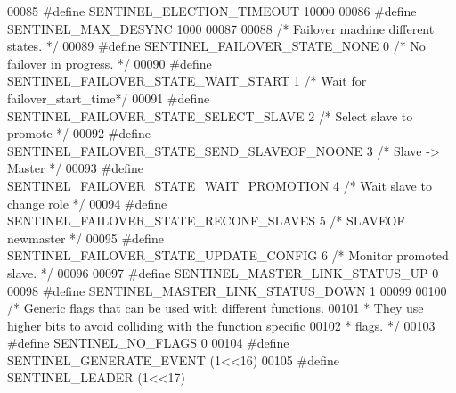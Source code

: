\begin{DoxyCode}
00085 \textcolor{preprocessor}{#}\textcolor{preprocessor}{define} \textcolor{preprocessor}{SENTINEL\_ELECTION\_TIMEOUT} 10000
00086 \textcolor{preprocessor}{#}\textcolor{preprocessor}{define} \textcolor{preprocessor}{SENTINEL\_MAX\_DESYNC} 1000
00087 
00088 \textcolor{comment}{/* Failover machine different states. */}
00089 \textcolor{preprocessor}{#}\textcolor{preprocessor}{define} \textcolor{preprocessor}{SENTINEL\_FAILOVER\_STATE\_NONE} 0  \textcolor{comment}{/* No failover in progress. */}
00090 \textcolor{preprocessor}{#}\textcolor{preprocessor}{define} \textcolor{preprocessor}{SENTINEL\_FAILOVER\_STATE\_WAIT\_START} 1  \textcolor{comment}{/* Wait for failover\_start\_time*/}
00091 \textcolor{preprocessor}{#}\textcolor{preprocessor}{define} \textcolor{preprocessor}{SENTINEL\_FAILOVER\_STATE\_SELECT\_SLAVE} 2 \textcolor{comment}{/* Select slave to promote */}
00092 \textcolor{preprocessor}{#}\textcolor{preprocessor}{define} \textcolor{preprocessor}{SENTINEL\_FAILOVER\_STATE\_SEND\_SLAVEOF\_NOONE} 3 \textcolor{comment}{/* Slave -> Master */}
00093 \textcolor{preprocessor}{#}\textcolor{preprocessor}{define} \textcolor{preprocessor}{SENTINEL\_FAILOVER\_STATE\_WAIT\_PROMOTION} 4 \textcolor{comment}{/* Wait slave to change role */}
00094 \textcolor{preprocessor}{#}\textcolor{preprocessor}{define} \textcolor{preprocessor}{SENTINEL\_FAILOVER\_STATE\_RECONF\_SLAVES} 5 \textcolor{comment}{/* SLAVEOF newmaster */}
00095 \textcolor{preprocessor}{#}\textcolor{preprocessor}{define} \textcolor{preprocessor}{SENTINEL\_FAILOVER\_STATE\_UPDATE\_CONFIG} 6 \textcolor{comment}{/* Monitor promoted slave. */}
00096 
00097 \textcolor{preprocessor}{#}\textcolor{preprocessor}{define} \textcolor{preprocessor}{SENTINEL\_MASTER\_LINK\_STATUS\_UP} 0
00098 \textcolor{preprocessor}{#}\textcolor{preprocessor}{define} \textcolor{preprocessor}{SENTINEL\_MASTER\_LINK\_STATUS\_DOWN} 1
00099 
00100 \textcolor{comment}{/* Generic flags that can be used with different functions.}
00101 \textcolor{comment}{ * They use higher bits to avoid colliding with the function specific}
00102 \textcolor{comment}{ * flags. */}
00103 \textcolor{preprocessor}{#}\textcolor{preprocessor}{define} \textcolor{preprocessor}{SENTINEL\_NO\_FLAGS} 0
00104 \textcolor{preprocessor}{#}\textcolor{preprocessor}{define} \textcolor{preprocessor}{SENTINEL\_GENERATE\_EVENT} \textcolor{preprocessor}{(}1\textcolor{preprocessor}{<<}16\textcolor{preprocessor}{)}
00105 \textcolor{preprocessor}{#}\textcolor{preprocessor}{define} \textcolor{preprocessor}{SENTINEL\_LEADER} \textcolor{preprocessor}{(}1\textcolor{preprocessor}{<<}17\textcolor{preprocessor}{)}

\end{DoxyCode}

